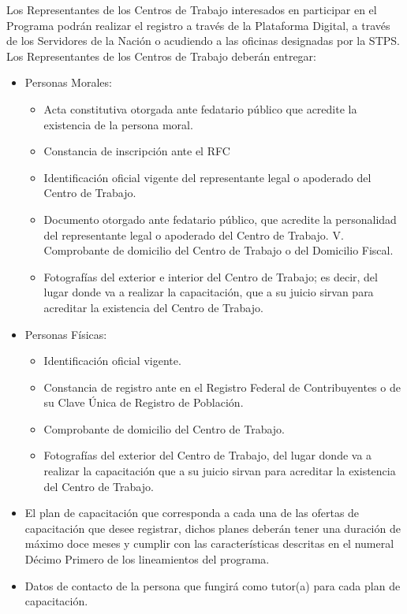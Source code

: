    Los Representantes de los Centros de Trabajo interesados en participar en el Programa podrán realizar el registro a través de la Plataforma Digital, a través de los Servidores de la Nación o acudiendo a las oficinas designadas por la STPS\cite{JCF}.
   \\
   Los Representantes de los Centros de Trabajo deberán entregar:
   \begin{itemize}
    \item Personas Morales:
        \begin{itemize}
        \item Acta constitutiva otorgada ante fedatario público que acredite la existencia de la persona moral.
        \item Constancia de inscripción ante el RFC 
        \item Identificación oficial vigente del representante legal o apoderado del Centro de Trabajo. 
        \item Documento otorgado ante fedatario público, que acredite la personalidad del representante legal o apoderado del Centro de Trabajo. V. Comprobante de domicilio del Centro de Trabajo o del Domicilio Fiscal. 
        \item Fotografías del exterior e interior del Centro de Trabajo; es decir, del lugar donde va a realizar la capacitación, que a su juicio sirvan para acreditar la existencia del Centro de Trabajo. 
        \end{itemize} 
    \item  Personas Físicas:
        \begin{itemize}
        \item Identificación oficial vigente. 
        \item  Constancia de registro ante en el Registro Federal de Contribuyentes o de su Clave Única de Registro de Población.
        \item  Comprobante de domicilio del Centro de Trabajo.
        \item  Fotografías del exterior del Centro de Trabajo, del lugar donde va a realizar la capacitación que a su juicio sirvan para acreditar la existencia del Centro de Trabajo. 
        \end{itemize} 
        
    \item  El plan de capacitación que corresponda a cada una de las ofertas de capacitación que desee registrar, dichos planes deberán tener una duración de máximo doce meses y cumplir con las características descritas en el numeral Décimo Primero de los lineamientos del programa.
   \item Datos de contacto de la persona que fungirá como tutor(a) para cada plan de capacitación. 
    \end{itemize} 
   
